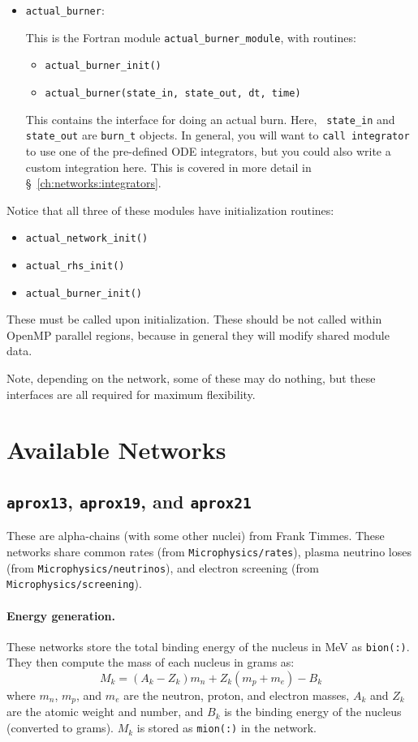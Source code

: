\begin{itemize}
\item {\tt actual\_burner}:

  This is the Fortran module {\tt actual\_burner\_module}, with routines:
  \begin{itemize}
  \item {\tt actual\_burner\_init()}
  \item {\tt actual\_burner(state\_in, state\_out, dt, time)}
  \end{itemize}

  This contains the interface for doing an actual burn.  Here, {\tt
    state\_in} and {\tt state\_out} are {\tt burn\_t} objects.  In
  general, you will want to {\tt call integrator} to use one of the
  pre-defined ODE integrators, but you could also write a custom
  integration here. This is covered in more detail in \S~\ref{ch:networks:integrators}.

\end{itemize}

Notice that all three of these modules have initialization routines:
\begin{itemize}
  \item {\tt actual\_network\_init()}
  \item {\tt actual\_rhs\_init()}
  \item {\tt actual\_burner\_init()}
\end{itemize}
These must be called upon initialization. These should be not called
within OpenMP parallel regions, because in general they will modify
shared module data.

Note, depending on the network, some of these may do nothing, but
these interfaces are all required for maximum flexibility.


\section{Available Networks}


\subsection{{\tt aprox13}, {\tt aprox19}, and {\tt aprox21}}

These are alpha-chains (with some other nuclei) from Frank Timmes.
These networks share common rates (from {\tt Microphysics/rates}),
plasma neutrino loses (from {\tt Microphysics/neutrinos}), and
electron screening (from {\tt Microphysics/screening}).

\paragraph{Energy generation.} These networks store the total binding
energy of the nucleus in MeV as {\tt bion(:)}.  They then compute the
mass of each nucleus in grams as:
\begin{equation}
M_k = (A_k - Z_k) m_n + Z_k (m_p + m_e) - B_k
\end{equation}
where $m_n$, $m_p$, and $m_e$ are the neutron, proton, and electron
masses, $A_k$ and $Z_k$ are the atomic weight and number, and $B_k$
is the binding energy of the nucleus (converted to grams).  $M_k$
is stored as {\tt mion(:)} in the network.

